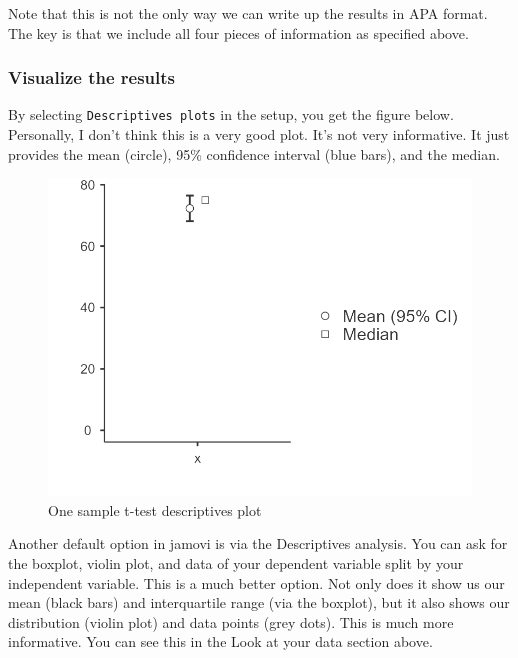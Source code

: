 \documentclass[
]{book}
\begin{document}
Note that this is not the only way we can write up the results in APA format. The key is that we include all four pieces of information as specified above.

\hypertarget{visualize-the-results}{%
\subsubsection{Visualize the results}\label{visualize-the-results}}

By selecting \texttt{Descriptives\ plots} in the setup, you get the figure below. Personally, I don't think this is a very good plot. It's not very informative. It just provides the mean (circle), 95\% confidence interval (blue bars), and the median.

\begin{figure}

{\centering \includegraphics[width=1\linewidth]{images/07.1-one_sample_t-test/results-plot} 

}

\caption{One sample t-test descriptives plot}\label{fig:unnamed-chunk-7}
\end{figure}

Another default option in jamovi is via the Descriptives analysis. You can ask for the boxplot, violin plot, and data of your dependent variable split by your independent variable. This is a much better option. Not only does it show us our mean (black bars) and interquartile range (via the boxplot), but it also shows our distribution (violin plot) and data points (grey dots). This is much more informative. You can see this in the Look at your data section above.
\end{document}
